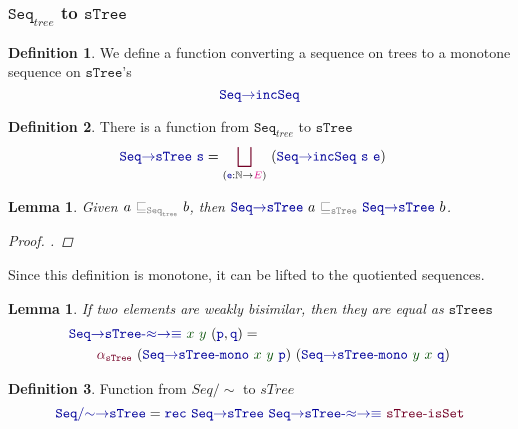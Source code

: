 \documentclass[twoside,11pt,openright]{report}
\theoremstyle{plain} %
\newtheorem{lem}[thm]{Lemma}
\theoremstyle{definition}
\newtheorem{defn}{Definition}[section]
\theoremstyle{remark}
\newcommand*{\term}[1]{\textcolor{green!30!black}{#1}} %
\newcommand*{\type}[1]{\textcolor{magenta!90!black}{#1}}
\newcommand*{\relation}[1]{\textcolor{gray}{\ensuremath{\mathtt{#1}}}}
\newcommand*{\function}[1]{\textcolor{blue!60!black}{\ensuremath{\mathtt{#1}}}}
\newcommand*{\constructor}[1]{\textcolor{purple!60!black}{\ensuremath{\mathtt{#1}}}}
\newcommand*{\typeformer}[1]{\ensuremath{\mathtt{#1}}}
\begin{document}
\subsubsection{\(\typeformer{Seq}_{tree}\) to \(\typeformer{sTree}\)}
\begin{defn}
  We define a function converting a sequence on trees to a monotone sequence on \typeformer{sTree}'s
  \begin{equation}
    \function{Seq{\rightarrow}incSeq}
  \end{equation}
\end{defn}
\begin{defn}
  There is a function from \(\typeformer{Seq}_{tree}\) to \(\typeformer{sTree}\)
  \begin{equation}
    \begin{aligned}
      &\function{Seq{\rightarrow}sTree}~\function{s} = \mathop{\constructor{\bigsqcup}}_{(\function{e} : \mathbb{N} \rightarrow \type{E})}~(\function{Seq{\rightarrow}incSeq}~\function{s}~\function{e})
    \end{aligned}
  \end{equation}
\end{defn}
\begin{lem}
  Given \(a~\relation{\sqsubseteq_{\typeformer{Seq}_{tree}}}~b\), then \(\function{Seq{\rightarrow}sTree}~a~\relation{\sqsubseteq_{sTree}}~\function{Seq{\rightarrow}sTree}~b\).
  \begin{proof}
    .
  \end{proof}
\end{lem}
\noindent Since this definition is monotone, it can be lifted to the quotiented sequences.
\begin{lem}
  If two elements are weakly bisimilar, then they are equal as \function{sTrees} 
  \begin{equation}
    \begin{aligned}
      &\function{Seq{\rightarrow}sTree\text{-}{\approx}{\rightarrow}{\equiv}}~\term{x}~\term{y}~(\function{p},\function{q}) = \\
      &\qquad\constructor{\alpha_{sTree}}~(\function{Seq{\rightarrow}sTree\text{-}mono}~\term{x}~\term{y}~\function{p})~(\function{Seq{\rightarrow}sTree\text{-}mono}~\term{y}~\term{x}~\function{q})
    \end{aligned}
  \end{equation}
\end{lem}
\begin{defn}
  Function from \(Seq/{\sim}\) to \(sTree\)
  \begin{equation}
    \function{Seq/{\sim}{\rightarrow}sTree} = \function{rec}~\function{Seq{\rightarrow}sTree}~\function{Seq{\rightarrow}sTree\text{-}{\approx}{\rightarrow}{\equiv}}~\constructor{sTree\text{-}isSet}
  \end{equation}
\end{defn}
\end{document}
